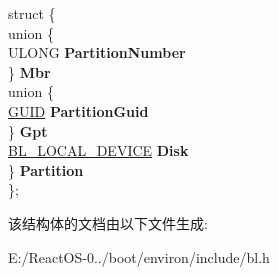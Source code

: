 \begin{DoxyCompactItemize}
\begin{tabbing}
\>struct \{\\
\>\>union \{\\
\>\>\>ULONG {\bfseries PartitionNumber}\\
\>\>\} {\bfseries Mbr}\\
\>\>union \{\\
\>\>\>\hyperlink{interface_g_u_i_d}{GUID} {\bfseries PartitionGuid}\\
\>\>\} {\bfseries Gpt}\\
\>\>\hyperlink{struct___b_l___l_o_c_a_l___d_e_v_i_c_e}{BL\_LOCAL\_DEVICE} {\bfseries Disk}\\
\>\} {\bfseries Partition}\\
\}; \\

\end{tabbing}\end{DoxyCompactItemize}


该结构体的文档由以下文件生成\+:\begin{DoxyCompactItemize}
\item 
E\+:/\+React\+O\+S-\/0../boot/environ/include/bl.\+h\end{DoxyCompactItemize}
